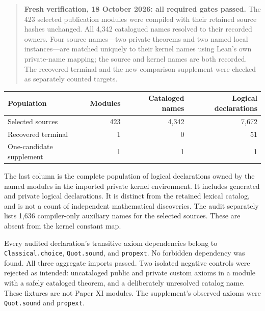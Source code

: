 \begin{quote}
\textbf{Fresh verification, 18 October 2026: all required gates passed.}
The 423 selected publication modules were compiled with their retained source
hashes unchanged. All 4,342 catalogued names resolved to their recorded owners.
Four source names---two private theorems and two named local instances---are
matched uniquely to their kernel names using Lean's own private-name mapping;
the source and kernel names are both recorded.
The recovered terminal and the new comparison supplement were checked as
separately counted targets.
\end{quote}

\begin{center}\small
\begin{tabular}{@{}lrrr@{}}
\toprule
Population & Modules & Cataloged names & Logical declarations\\
\midrule
Selected sources & 423 & 4,342 & 7,672\\
Recovered terminal & 1 & 0 & 51\\
One-candidate supplement & 1 & 1 & 1\\
\bottomrule
\end{tabular}
\end{center}

The last column is the complete population of logical declarations owned by
the named modules in the imported private kernel environment. It includes
generated and private logical declarations. It is distinct from the retained
lexical catalog, and is not a count of independent mathematical discoveries.
The audit separately lists 1,636 compiler-only auxiliary names for
the selected sources. These are absent from the kernel constant map.

Every audited declaration's transitive axiom dependencies belong to
\texttt{Classical.choice}, \texttt{Quot.sound}, and \texttt{propext}.
No forbidden dependency was found. All three aggregate imports passed.
Two isolated negative controls were rejected as intended: uncataloged public
and private custom axioms in a module with a safely cataloged theorem, and a
deliberately unresolved catalog name. These fixtures are not Paper XI modules.
The supplement's observed axioms were \texttt{Quot.sound} and \texttt{propext}.

